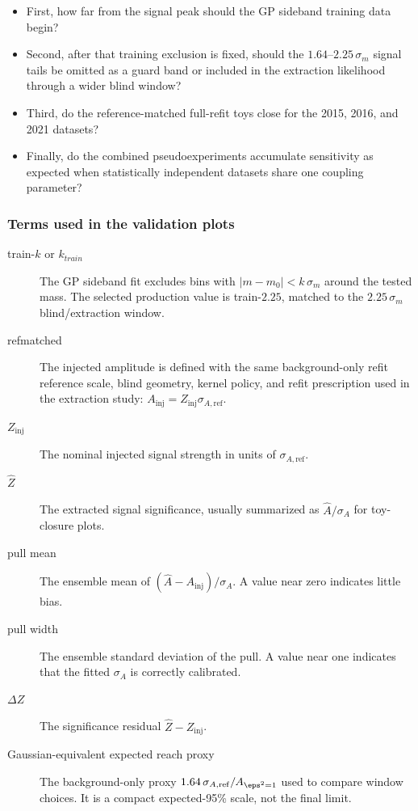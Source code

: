 \begin{itemize}
    \item First, how far from the signal peak should the GP sideband training data begin?

    \item  Second, after that training exclusion is fixed, should the $1.64$--$2.25\,\sigma_m$ signal tails be omitted as a guard band or included in the extraction likelihood through a wider blind window?

    \item Third, do the reference-matched full-refit toys close for the 2015, 2016, and 2021 datasets?

    \item   Finally, do the combined pseudoexperiments accumulate sensitivity as expected when statistically independent datasets share one coupling parameter?

\end{itemize}



\subsubsection*{Terms used in the validation plots}

\begin{description}
\item[train-$k$ or $k_{train}$] The GP sideband fit excludes bins with
$|m-m_0|<k\,\sigma_m$ around the tested mass. The selected production value is
train-$2.25$, matched to the $2.25\,\sigma_m$ blind/extraction window.
\item[refmatched] The injected amplitude is defined with the same
background-only refit reference scale, blind geometry, kernel policy, and refit
prescription used in the extraction study:
$A_{\mathrm{inj}}=Z_{\mathrm{inj}}\sigma_{A,\mathrm{ref}}$.
\item[$Z_{\mathrm{inj}}$] The nominal injected signal strength in units of
$\sigma_{A,\mathrm{ref}}$.
\item[$\hat Z$] The extracted signal significance, usually summarized as
$\hat A/\sigma_A$ for toy-closure plots.
\item[pull mean] The ensemble mean of
$(\hat A-A_{\mathrm{inj}})/\sigma_A$. A value near zero indicates little bias.
\item[pull width] The ensemble standard deviation of the pull. A value near one
indicates that the fitted $\sigma_A$ is correctly calibrated.
\item[$\Delta Z$] The significance residual $\hat Z-Z_{\mathrm{inj}}$.
\item[Gaussian-equivalent expected reach proxy] The background-only proxy
$1.64\,\sigma_{A,\mathrm{ref}}/A_{\eps^2=1}$ used to compare window choices. It is a
compact expected-95\% scale, not the final \CLs{} limit.
\end{description}

